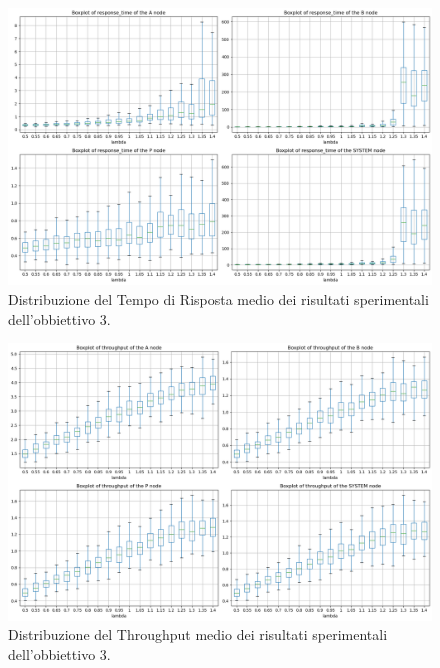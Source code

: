 \begin{figure}
    \centering
    \includegraphics[width=1\linewidth]{figs//results//obj3//simulation/obj3_boxplot_rtime.png}
    \caption{Distribuzione del Tempo di Risposta medio dei risultati sperimentali dell'obbiettivo 3.}
    \label{fig:obj3_boxplot_rtime}
\end{figure}

\begin{figure}
    \centering
    \includegraphics[width=1\linewidth]{figs//results//obj3//simulation/obj3_boxplot_throughput.png}
    \caption{Distribuzione del Throughput medio dei risultati sperimentali dell'obbiettivo 3.}
    \label{fig:obj3_boxplot_throughput}
\end{figure}

